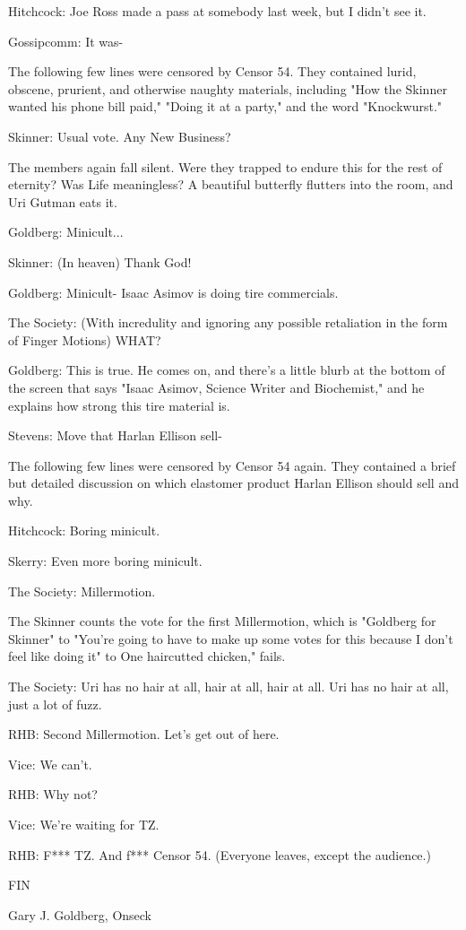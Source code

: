 \documentclass[12pt]{article}
\begin{document}
Hitchcock: Joe Ross made a pass at somebody last week, but I didn't see it.

Gossipcomm: It was-

The following few lines were censored by Censor 54. They contained lurid, obscene, prurient, and otherwise naughty materials, including "How the Skinner wanted his phone bill paid," "Doing it at a party," and the word "Knockwurst."

Skinner: Usual vote. Any New Business?

The members again fall silent. Were they trapped to endure this for the rest of eternity? Was Life meaningless? A beautiful butterfly flutters into the room, and Uri Gutman eats it.

Goldberg: Minicult...

Skinner: (In heaven) Thank God!

Goldberg: Minicult- Isaac Asimov is doing tire commercials.

The Society: (With incredulity and ignoring any possible retaliation in the form of Finger Motions) WHAT?

Goldberg: This is true. He comes on, and there's a little blurb at the bottom of the screen that says "Isaac Asimov, Science Writer and Biochemist," and he explains how strong this tire material is.

Stevens: Move that Harlan Ellison sell-

The following few lines were censored by Censor 54 again. They contained a brief but detailed discussion on which elastomer product Harlan Ellison should sell and why.

Hitchcock: Boring minicult.

Skerry: Even more boring minicult.

The Society: Millermotion.

The Skinner counts the vote for the first Millermotion, which is "Goldberg for Skinner" to "You're going to have to make up some votes for this because I don't feel like doing it" to One haircutted chicken," fails.

The Society: Uri has no hair at all, hair at all, hair at all. Uri has no hair at all, just a lot of fuzz.

RHB: Second Millermotion. Let's get out of here.

Vice: We can't.

RHB: Why not?

Vice: We're waiting for TZ.

RHB: F*** TZ. And f*** Censor 54. (Everyone leaves, except the audience.)

FIN

\vspace{12pt}

\centerline{Gary J. Goldberg, Onseck}
\end{document}
